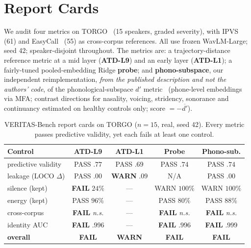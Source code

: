 \documentclass[conference]{IEEEtran}
\newcommand{\ns}{\emph{n.s.}}
\begin{document}
\section{Report Cards}
\label{sec:cards}
We audit four metrics on TORGO~\cite{rudzicz2012torgo} (15 speakers, graded
severity), with IPVS~\cite{dimauro2017ipvs} (61) and
EasyCall~\cite{turrisi2021easycall} (55) as cross-corpus references. All use frozen
WavLM-Large; seed 42; speaker-disjoint throughout. The metrics are: a
trajectory-distance reference metric at a mid layer (\textbf{ATD-L9}) and an early
layer (\textbf{ATD-L1}); a fairly-tuned pooled-embedding Ridge \textbf{probe}; and
\textbf{phono-subspace}, our independent reimplementation, \emph{from the published
description and not the authors' code}, of the phonological-subspace $d'$
metric~\cite{frozenssl2026a,frozenssl2026b} (phone-level embeddings via MFA;
contrast directions for nasality, voicing, stridency, sonorance and continuancy
estimated on healthy controls only; score $=-\overline{d'}$).

\begin{table}[t]
\centering
\caption{VERITAS-Bench report cards on TORGO ($n{=}15$, real, seed 42). Every
metric passes predictive validity, yet each fails at least one control.}
\label{tab:cards}
\small
\begin{tabular}{@{}lcccc@{}}
\toprule
Control & ATD-L9 & ATD-L1 & Probe & \textbf{Phono-sub.}\\
\midrule
predictive validity     & PASS $.77$ & PASS $.69$ & PASS $.74$ & PASS $.74$\\
leakage (LOCO $\Delta$) & PASS $.00$ & \textbf{WARN} $.09$ & N/A & PASS $.00$\\
silence (kept)          & \textbf{FAIL} $24\%$ & --- & WARN $100\%$ & WARN $100\%$\\
energy (kept)           & PASS $96\%$ & --- & PASS $80\%$ & PASS $88\%$\\
cross-corpus            & \textbf{FAIL} \ns & --- & \textbf{FAIL} \ns & \textbf{FAIL} \ns\\
identity AUC            & \textbf{FAIL} $.996$ & --- & \textbf{FAIL} $.996$ & \textbf{FAIL} $.999$\\
\midrule
\textbf{overall}        & \textbf{FAIL} & \textbf{WARN} & \textbf{FAIL} & \textbf{FAIL}\\
\bottomrule
\end{tabular}
\end{table}
\end{document}
